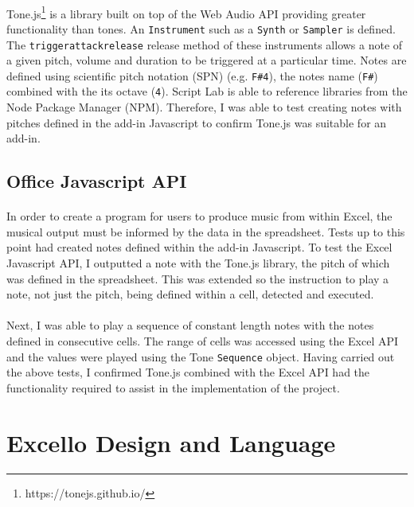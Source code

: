 \paragraph{} Tone.js\footnote{https://tonejs.github.io/} is a library built on top of the Web Audio API providing greater functionality than tones. An \texttt{Instrument} such as a \texttt{Synth} or \texttt{Sampler} is defined. The \texttt{triggerattackrelease} release method of these instruments allows a note of a given pitch, volume and duration to be triggered at a particular time. Notes are defined using scientific pitch notation (SPN) (e.g. \texttt{F\#4}), the notes name (\texttt{F\#}) combined with the its octave (\texttt{4}). Script Lab is able to reference libraries from the Node Package Manager (NPM). Therefore, I was able to test creating notes with pitches defined in the add-in Javascript to confirm Tone.js was suitable for an add-in.

\subsection{Office Javascript API}

\paragraph{} In order to create a program for users to produce music from within Excel, the musical output must be informed by the data in the spreadsheet. Tests up to this point had created notes defined within the add-in Javascript. To test the Excel Javascript API, I outputted a note with the Tone.js library, the pitch of which was defined in the spreadsheet. This was extended so the instruction to play a note, not just the pitch, being defined within a cell, detected and executed.

\paragraph{} Next, I was able to play a sequence of constant length notes with the notes defined in consecutive cells.  The range of cells was accessed using the Excel API and the values were played using the Tone \texttt{Sequence} object. Having carried out the above tests, I confirmed Tone.js combined with the Excel API had the functionality required to assist in the implementation of the project.

\section{Excello Design and Language}

